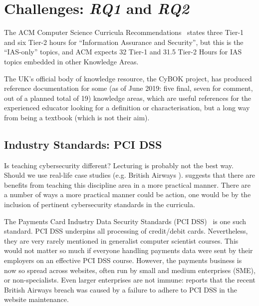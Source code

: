\documentclass[conference]{IEEEtran}
\begin{document}
\section{Challenges: {\emph{RQ1}} and {\emph{RQ2}}}

The ACM Computer Science Curricula Recommendations~\cite{ACM2013a} states three Tier-1 and six Tier-2 hours for ``Information Assurance and Security'', but this is the ``IAS-only'' topics, and ACM expects 32 Tier-1 and 31.5 Tier-2 Hours for IAS topics embedded in other Knowledge Areas.

The UK's official body of knowledge resource, the CyBOK project\cite{Bristol2019a}, has produced reference documentation for some (as of June 2019: five final, seven for comment, out of a planned total of 19)   %
knowledge areas, which are useful references for the experienced educator looking for a definition or characterisation, but a long way from being a textbook (which is not their aim).


\subsection{Industry Standards: PCI DSS}\label{sec:PCIDSS}

Is teaching cybersecurity different? Lecturing is probably not the best way. Should we use real-life case studies (e.g. British Airways \cite{Barth2018a}). \cite{Weiss:2013:THC:2527148.2527180} suggests that there are benefits from teaching this discipline area in a more practical manner.  There are a number of ways a more practical manner could be action, one would be by the inclusion of pertinent cybersecurity standards in the curricula.

The Payments Card Industry Data Security Standards (PCI DSS)~\cite{PCI2018b} is one such standard. PCI DSS underpins all processing of credit/debit cards. Nevertheless, they are very rarely mentioned in generalist computer scientist courses. This would not matter so much if everyone handling payments data were sent by their employers on an effective PCI DSS course. However, the payments business is now so spread across websites, often run by small and medium enterprises (SME), or non-specialists.  Even larger enterprises are not immune: \cite{Barth2018a} reports that the recent British Airways breach was caused by a failure to adhere to PCI DSS in the website maintenance. 
\end{document}
